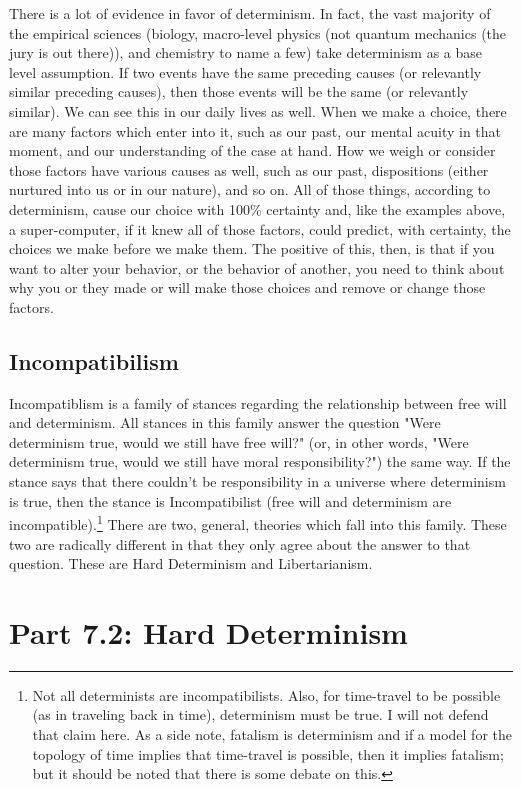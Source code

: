 There is a lot of evidence in favor of determinism. In fact, the vast majority of the empirical sciences (biology, macro-level physics (not quantum mechanics (the jury is out there)), and chemistry to name a few) take determinism as a base level assumption. If two events have the same preceding causes (or relevantly similar preceding causes), then those events will be the same (or relevantly similar). We can see this in our daily lives as well. When we make a choice, there are many factors which enter into it, such as our past, our mental acuity in that moment, and our understanding of the case at hand. How we weigh or consider those factors have various causes as well, such as our past, dispositions (either nurtured into us or in our nature), and so on. All of those things, according to determinism, cause our choice with 100\% certainty and, like the examples above, a super-computer, if it knew all of those factors, could predict, with certainty, the choices we make before we make them. The positive of this, then, is that if you want to alter your behavior, or the behavior of another, you need to think about why you or they made or will make those choices and remove or change those factors.  

\subsection{Incompatibilism}

Incompatiblism is a family of stances regarding the relationship between free will and determinism. All stances in this family answer the question "Were determinism true, would we still have free will?" (or, in other words, "Were determinism true, would we still have moral responsibility?") the same way. If the stance says that there couldn't be responsibility in a universe where determinism is true, then the stance is Incompatibilist (free will and determinism are incompatible).\footnote{Not all determinists are incompatibilists. Also, for time-travel to be possible (as in traveling back in time), determinism must be true.  I will not defend that claim here. As a side note, fatalism is determinism and if a model for the topology of time implies that time-travel is possible, then it implies fatalism; but it should be noted that there is some debate on this.} There are two, general, theories which fall into this family. These two are radically different in that they only agree about the answer to that question. These are Hard Determinism and Libertarianism. 

\section{Part 7.2: Hard Determinism}

